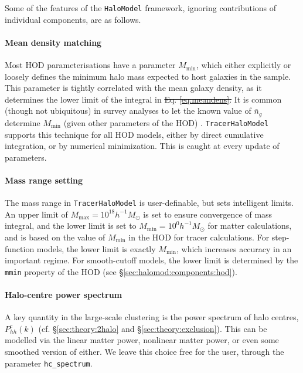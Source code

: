 \documentclass[5p,aas_macros]{elsarticle}
\providecommand{\DIFaddtex}[1]{{\protect\color{blue}\uwave{#1}}} %
\providecommand{\DIFdeltex}[1]{{\protect\color{red}\sout{#1}}}                      %
\providecommand{\DIFaddbegin}{} %
\providecommand{\DIFaddend}{} %
\providecommand{\DIFdelbegin}{} %
\providecommand{\DIFdelend}{} %
\providecommand{\DIFadd}[1]{\texorpdfstring{\DIFaddtex{#1}}{#1}} %
\providecommand{\DIFdel}[1]{\texorpdfstring{\DIFdeltex{#1}}{}} %
\begin{document}
Some of the features of the \verb|HaloModel| framework, ignoring contributions of individual components, are as follows.

\paragraph*{Mean density matching} 
Most HOD parameterisations have a parameter $M_\text{min}$, which either explicitly or loosely defines the minimum halo mass expected to host galaxies in the sample. This parameter is tightly correlated with the mean galaxy density, as it determines the lower limit of the integral in \DIFdelbegin \DIFdel{Eq. \ref{eq:meandens}. }\DIFdelend \DIFaddbegin \DIFadd{\mbox{%
\cref{eq:meandens}}\hspace{0pt}%
. }\DIFaddend It is common (though not ubiquitous) in survey analyses to let the known value of $\bar{n}_g$ determine $M_\text{min}$ (given other parameters of the HOD) \citep[eg][]{Beutler2013}. \verb|TracerHaloModel| supports this technique for all HOD models, either by direct cumulative integration, or by numerical minimization. This is caught at every update of parameters.

\paragraph*{Mass range setting}
The mass range in \verb|TracerHaloModel| is user-definable, but sets intelligent limits. An upper limit of $M_\text{max} = 10^{18}h^{-1}M_\odot$ is set to ensure convergence of mass integral, and the lower limit is set to $M_\text{min} = 10^{0}h^{-1}M_\odot$ for matter calculations, and is based on the value of $M_\text{min}$ in the HOD for tracer calculations. For step-function models, the lower limit is exactly $M_\text{min}$, which increases accuracy in an important regime. For smooth-cutoff models, the lower limit is determined by the \verb|mmin| property of the HOD (see \S\ref{sec:halomod:components:hod}).

\paragraph*{Halo-centre power spectrum}
A key quantity in the large-scale clustering is the power spectrum of halo centres, \DIFdelbegin \DIFdel{$P_{hh}^c(k)$ }\DIFdelend \DIFaddbegin \DIFadd{$P_{\rm hh}^c(k)$ }\DIFaddend (cf. \S\ref{sec:theory:2halo} and \S\ref{sec:theory:exclusion}). This can be modelled via the linear matter power, nonlinear matter power, or even some smoothed version of either. We leave this choice free for the user, through the parameter \verb|hc_spectrum|. 
\end{document}
